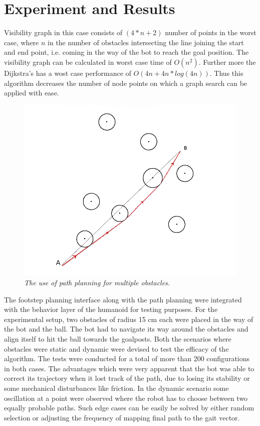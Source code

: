 \documentclass[letterpaper, 10 pt, conference]{ieeeconf}  %
\begin{document}
\section{Experiment and Results}
Visibility graph in this case consists of $(4*n+2)$ number of points in the worst case, where $n$ in the number of obstacles intersecting the line joining the start and end point, i.e. coming in the way of the bot to reach the goal position. The visibility graph can be calculated in worst case time of $O(n^2)$. Further more the Dijkstra's has a wost case performance of $O(4n+4n*log(4n))$. Thus this algorithm decreases the number of node points on which a graph search can be applied with ease. \\
\begin{figure}[b]  
\begin{center}  
\includegraphics[scale=0.25]{test1.JPG}  
\caption{\small \sl The use of path planning for multiple obstacles. \label{fig:test}}  
\end{center}  
\end{figure}
The footstep planning interface along with the path planning were integrated with the behavior layer of the humanoid for testing purposes. For the experimental setup, two obstacles of radius 15 cm each were placed in the way of the bot and the ball. The bot had to navigate its way around the obstacles and align itself to hit the ball towards the goalposts. Both the scenarios where obstacles were static and dynamic were devised to test the efficacy of the algorithm. The tests were conducted for a total of more than 200 configurations in both cases. The advantages which were very apparent that the bot was able to correct its trajectory when it lost track of the path, due to losing its stability or some mechanical disturbances like friction. In the dynamic scenario some oscillation at a point were observed where the robot has to choose between two equally probable paths. Such edge cases can be easily be solved by either random selection or adjusting the frequency of mapping final path to the gait vector.\\
\end{document}
